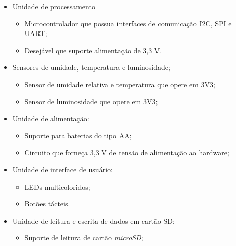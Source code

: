 \begin{itemize}
 
 \item Unidade de processamento
     \begin{itemize}
         \item Microcontrolador que possua interfaces de comunicação \gls{I2C}, \gls{SPI} e \gls{UART};
         \item Desejável que suporte alimentação de 3,3 V.
     \end{itemize}

 \item Sensores de umidade, temperatura e luminosidade; 
  \begin{itemize}
     \item Sensor de umidade relativa e temperatura que opere em 3V3;
     \item Sensor de luminosidade que opere em 3V3;
 \end{itemize}
 
 \item Unidade de alimentação:
     \begin{itemize}
         \item Suporte para baterias do tipo AA;
         \item Circuito que forneça 3,3 V de tensão de alimentação ao hardware;
    \end{itemize} 

\item Unidade de interface de usuário: 

    \begin{itemize}
        \item LEDs multicoloridos;
        \item Botões tácteis.
    \end{itemize}
 
 \item Unidade de leitura e escrita de dados em cartão SD;
     \begin{itemize}
         \item Suporte de leitura de cartão \textit{microSD};
     \end{itemize}
\end{itemize}

